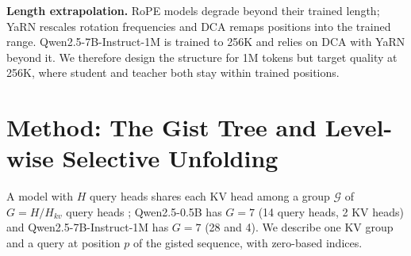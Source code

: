 \documentclass[10pt,twocolumn]{article}
\newcommand{\para}[1]{\noindent\textbf{#1}\hspace{0.5em}}
\begin{document}
\para{Length extrapolation.}
RoPE \citep{su2024roformer} models degrade beyond their trained length; YaRN
\citep{peng2024yarn} rescales rotation frequencies and DCA \citep{an2024dca} remaps positions
into the trained range. Qwen2.5-7B-Instruct-1M \citep{yang2025qwen1m} is trained to 256K and
relies on DCA with YaRN beyond it. We therefore design the structure for 1M tokens but target
quality at 256K, where student and teacher both stay within trained positions.

\section{Method: The Gist Tree and Level-wise Selective Unfolding}
\label{sec:method}

A model with $H$ query heads shares each KV head among a group $\mathcal{G}$ of $G=H/H_{kv}$
query heads \citep{ainslie2023gqa}; Qwen2.5-0.5B has $G=7$ (14 query heads, 2 KV heads) and
Qwen2.5-7B-Instruct-1M has $G=7$ (28 and 4). We describe one KV group and a query at
position $p$ of the gisted sequence, with zero-based indices.
\end{document}
